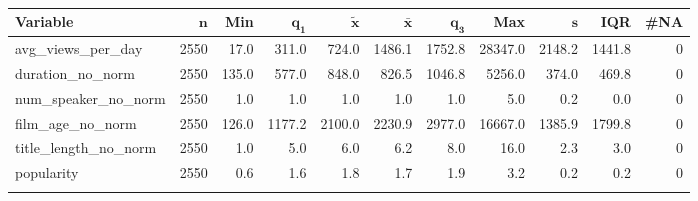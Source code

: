 \begingroup\footnotesize
\begin{longtable}{lrrrrrrrrrr}
 \textbf{Variable} & $\mathbf{n}$ & \textbf{Min} & $\mathbf{q_1}$ & $\mathbf{\widetilde{x}}$ & $\mathbf{\bar{x}}$ & $\mathbf{q_3}$ & \textbf{Max} & $\mathbf{s}$ & \textbf{IQR} & \textbf{\#NA} \\ 
  \hline
avg\_views\_per\_day & 2550 &  17.0 &  311.0 &  724.0 & 1486.1 & 1752.8 & 28347.0 & 2148.2 & 1441.8 & 0 \\ 
  duration\_no\_norm & 2550 & 135.0 &  577.0 &  848.0 &  826.5 & 1046.8 &  5256.0 &  374.0 &  469.8 & 0 \\ 
  num\_speaker\_no\_norm & 2550 &   1.0 &    1.0 &    1.0 &    1.0 &    1.0 &     5.0 &    0.2 &    0.0 & 0 \\ 
  film\_age\_no\_norm & 2550 & 126.0 & 1177.2 & 2100.0 & 2230.9 & 2977.0 & 16667.0 & 1385.9 & 1799.8 & 0 \\ 
  title\_length\_no\_norm & 2550 &   1.0 &    5.0 &    6.0 &    6.2 &    8.0 &    16.0 &    2.3 &    3.0 & 0 \\ 
  popularity & 2550 &   0.6 &    1.6 &    1.8 &    1.7 &    1.9 &     3.2 &    0.2 &    0.2 & 0 \\ 
  \hline
\caption{} 
\label{}
\end{longtable}
\endgroup
